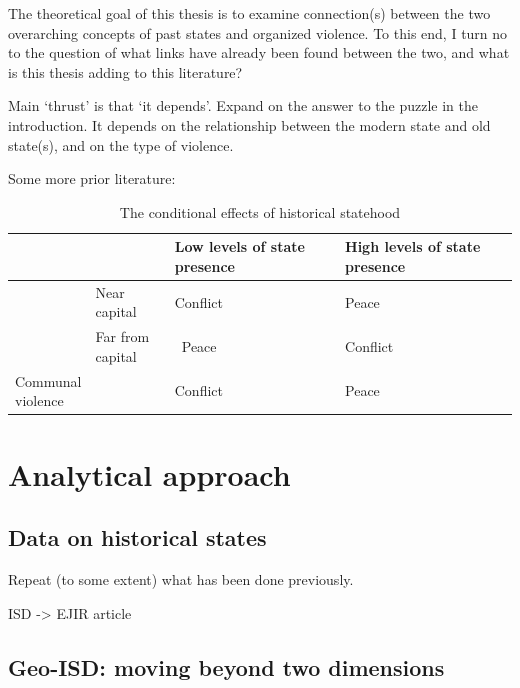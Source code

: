 The theoretical goal of this thesis is to examine connection(s) between the two
overarching concepts of past states and organized violence. To this end, I turn
no to the question of what links have already been found between the two, and
what is this thesis adding to this literature? 

Main `thrust' is that `it depends'. Expand on the answer to the puzzle in the
introduction. It depends on the relationship between the modern state and old
state(s), and on the type of violence.

Some more prior literature: \citet{Griffiths2016} \citet{Ahram2019}

\begin{table}
\begin{tabularx}{\textwidth}{>{\centering\arraybackslash}X>{\centering\arraybackslash}X|>{\centering\arraybackslash}X|>{\centering\arraybackslash}X}
    & & {Low levels of state presence} & {High levels of state presence} \\
\midrule
     \multirow{2}{=}{\centering State based violence} & Near capital & Conflict &  Peace \\
     \cmidrule{2-4}
					   & \makecell{Far from \\ capital} & \ Peace & Conflict \\
\midrule
     \makecell{Communal\\ violence} & & Conflict & Peace \\
\end{tabularx}
\caption{The conditional effects of historical statehood}
\end{table}


\section{Analytical approach} \label{Analytical approach}


\subsection{Data on historical states} \label{Data on historical states}

Repeat (to some extent) what has been done previously.

ISD -> EJIR article 

\subsection{Geo-ISD: moving beyond two dimensions} 
\label{Geo-ISD}

